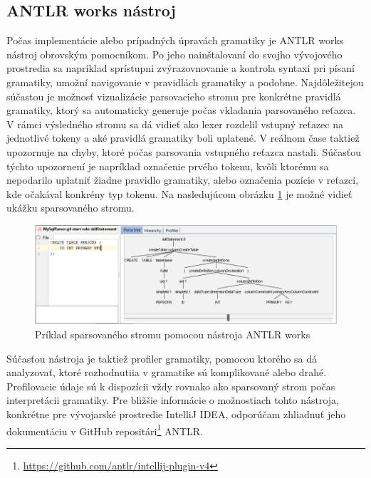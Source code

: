 \subsection{ANTLR works nástroj}
Počas implementácie alebo prípadných úpravách gramatiky je ANTLR works nástroj obrovským pomocníkom. Po jeho nainštalovaní do svojho vývojového prostredia sa napríklad sprístupni zvýrazovnovanie a kontrola syntaxi pri písaní gramatiky, umožní navigovanie v pravidlách gramatiky a podobne. Najdôležitejou súčastou je možnosť vizualizácie parsovacieho stromu pre konkrétne pravidlá gramatiky, ktorý sa automaticky generuje počas vkladania parsovaného reťazca. V rámci výsledného stromu sa dá vidieť ako lexer rozdelil vstupný reťazec na jednotlivé tokeny a aké pravidlá gramatiky boli uplatené. V reálnom čase taktiež upozornuje na chyby, ktoré počas parsovania vstupného reťazca nastali. Súčasťou týchto upozornení je napríklad označenie prvého tokenu, kvôli ktorému sa nepodarilo uplatniť žiadne pravidlo gramatiky, alebo označenia pozície v reťazci, kde očakával konkrény typ tokenu. Na nasledujúcom obrázku \ref{fig:antlrWorks} je možné vidieť ukážku sparsovaného stromu.

\begin{figure}[H]
\begin{center}
\includegraphics[width=15cm]{figures/antlrWorks.PNG}
\caption{Príklad sparsovaného stromu pomocou nástroja ANTLR works}
\label{fig:antlrWorks}
\end{center}
\end{figure}

Súčasťou nástroja je taktiež profiler gramatiky, pomocou ktorého sa dá analyzovať, ktoré rozhodnutiia v gramatike sú komplikované alebo drahé. Profilovacie údaje sú k dispozícii vždy rovnako ako sparsovaný strom počas interpretácii gramatiky. Pre bližšie informácie o možnostiach tohto nástroja, konkrétne pre vývojarské prostredie IntelliJ IDEA, odporúčam zhliadnuť jeho dokumentáciu v GitHub repositári\footnote{\url{https://github.com/antlr/intellij-plugin-v4}} ANTLR.